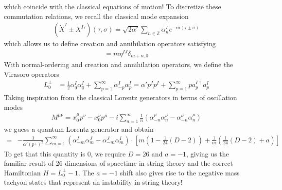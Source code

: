 \documentclass[11pt]{article}
\begin{document}
which coincide with the classical equations of motion! To discretize these commutation relations, we recall the classical mode expansion 
\begin{align*}
    (\dot{X}^I \pm {X^I}')(\tau, \sigma) = \sqrt{2\alpha' } \sum_{n \in \mathbb{Z}} \alpha_n^I e^{-in(\tau \pm \sigma)} \tag{9.74, 12.33}
\end{align*}
which allows us to define creation and annihilation operators satisfying 
\begin{align*}
    [\alpha_m^I, \alpha_n^J] = m \eta^{IJ} \delta_{m+n, 0} \tag{12.45}
\end{align*}
With normal-ordering and creation and annihilation operators, we define the Virasoro operators 
\begin{align*}
    L_0^\perp &= \frac{1}{2}\alpha_0^I \alpha_0^I + \sum_{p=1}^\infty \alpha_{-p}^I \alpha_p^I = \alpha' p^I p^I + \sum_{p=1}^\infty pa_p^{I\dagger} a_p^I \tag{12.105}
\end{align*}
Taking inspiration from the classical Lorentz generators in terms of oscillation modes 
\begin{align*}
    M^{\mu\nu} = x^\mu_0 p^\nu - x_0^\nu p^\mu - i \sum_{n=1}^\infty \frac{1}{n}(\alpha_{-n}^\mu \alpha_n^\nu - \alpha_{-n}^\nu \alpha_{n}^\mu ) \tag{12.147}
\end{align*}
we guess a quantum Lorentz generator and obtain 
\begin{align*}
    [M^{-I}, M^{-J}] = &- \frac{1}{\alpha' (p^+)^2} \sum_{m=1}^\infty (\alpha_{-m}^I \alpha_m^J - \alpha_{-m}^J \alpha_m^I ) \cdot \left[ m \left( 1 - \frac{1}{24} (D-2) \right) + \frac{1}{m}\left( \frac{1}{24}(D-2) + a \right) \right] \tag{12.152}
\end{align*}
To get that this quantity is 0, we require $D = 26$ and $a = -1$, giving us the familiar result of 26 dimensions of spacetime in string theory and the correct Hamiltonian $H = L_0^\perp -1$. The $a=-1$ shift also gives rise to the negative mass tachyon states that represent an instability in string theory!
\end{document}
